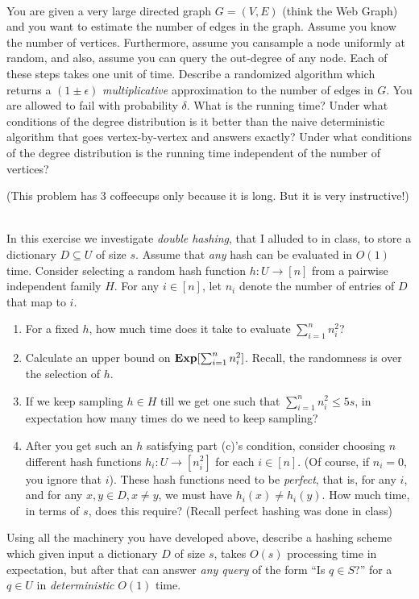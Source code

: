 \documentclass[11pt]{article}
\begin{document}
\vspace{1ex}
\begin{exercise}\Coffeecup \Coffeecup~
	
	You are given a very large directed graph $G = (V,E)$ (think the Web Graph) and you want to estimate the number of edges in the graph.
	Assume you know the number of vertices. Furthermore, assume you cansample a node uniformly at random, and also, assume you can query the out-degree of any node. Each of these steps takes one unit of time.
	 Describe a randomized algorithm which returns a $(1\pm \epsilon)$ {\em multiplicative} approximation to the number of edges in $G$. You are allowed to fail with probability $\delta$. What is the running time? Under what conditions of the degree distribution is it better than the naive deterministic algorithm that goes vertex-by-vertex and answers exactly? Under what conditions of the degree distribution is the running time independent of the number of vertices?
\end{exercise}

\vspace{1ex}
\begin{exercise}\Coffeecup \Coffeecup \Coffeecup (This problem has 3 coffeecups only because it is long. But it is very instructive!) ~
	
In this exercise we investigate {\em double hashing}, that I alluded to in class, to store a dictionary $D \subseteq U$ of size $s$.
Assume that {\em any} hash can be evaluated in $O(1)$ time.
Consider selecting a random hash function $h: U\to [n]$ from a pairwise independent family $H$. For any $i\in [n]$, let $n_i$ denote the number of entries of $D$ that map to $i$. 
\begin{enumerate}
	\item For a fixed $h$, how much time does it take to evaluate $\sum_{i=1}^n n^2_i$?
	\item Calculate an upper bound on $\mathbf{Exp}[\sum_{i=1}^n n_i^2]$. Recall, the randomness is over the selection of $h$.
	\item If we keep sampling $h \in H$ till we get one such that $\sum_{i=1}^n n^2_i \leq 5s$, in expectation how many times do we need to keep sampling? 
	\item After you get such an $h$ satisfying part (c)'s condition, consider choosing $n$ different hash functions $h_i : U \to [n_i^2]$ for each $i\in [n]$. (Of course, if $n_i = 0$, you ignore that $i$). These hash functions need to be {\em perfect}, that is, for any $i$, and for any $x,y\in D, x\neq y$, we must have $h_i(x) \neq h_i(y)$. How much time, in terms of $s$, does this require? (Recall perfect hashing was done in class)
\end{enumerate}

Using all the machinery you have developed above, describe a hashing scheme which given input a dictionary $D$ of size $s$,
takes $O(s)$ processing time in expectation, but after that can answer {\em any query} of the form ``Is $q\in S$?'' for a $q\in U$ in 
{\em deterministic} $O(1)$ time.
\end{exercise}
\end{document}
